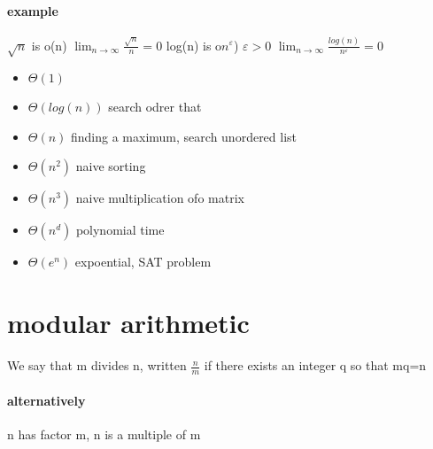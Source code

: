 \documentclass[a4paper,10pt]{article}
\begin{document}
{\paragraph{example}
$\sqrt{n}$ is o(n)
\newline
$\lim_{n\to \infty}\frac{\sqrt{n}}{n}=0$
\newline
log(n) is o$n^{\varepsilon}$) $\varepsilon>0$
\newline
$\lim_{n\to \infty}\frac{log(n)}{n^{\varepsilon}}=0$
\begin{itemize}
 \item $\Theta(1)$
 \item $\Theta(log(n))$ search odrer that
 \item $\Theta(n)$ finding a maximum, search unordered list
 \item $\Theta(n^2)$ naive sorting
 \item $\Theta(n^3)$ naive multiplication ofo matrix
 \item $\Theta(n^d)$ polynomial time
 \item $\Theta(e^n)$ expoential, SAT problem
\end{itemize}

\section{modular arithmetic}
We say that m divides n, written $\frac{n}{m}$ if there exists an integer q so that mq=n
\paragraph{alternatively}
n has factor m, n is a multiple of m
}
\end{document}
